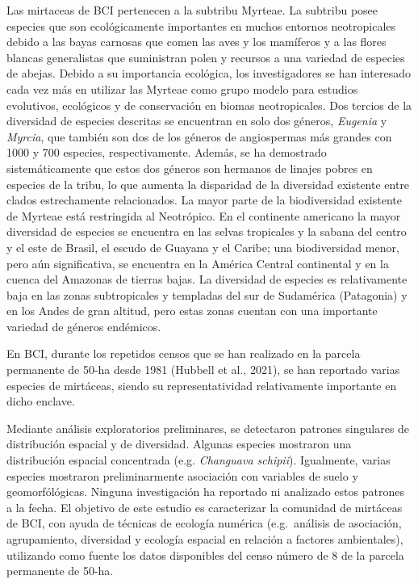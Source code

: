 \documentclass[11pt,]{article}
\begin{document}
Las mirtaceas de BCI pertenecen a la subtribu Myrteae. La subtribu posee
especies que son ecológicamente importantes en muchos entornos
neotropicales debido a las bayas carnosas que comen las aves y los
mamíferos y a las flores blancas generalistas que suministran polen y
recursos a una variedad de especies de abejas. Debido a su importancia
ecológica, los investigadores se han interesado cada vez más en utilizar
las Myrteae como grupo modelo para estudios evolutivos, ecológicos y de
conservación en biomas neotropicales. Dos tercios de la diversidad de
especies descritas se encuentran en solo dos géneros, \emph{Eugenia} y
\emph{Myrcia}, que también son dos de los géneros de angiospermas más
grandes con 1000 y 700 especies, respectivamente. Además, se ha
demostrado sistemáticamente que estos dos géneros son hermanos de
linajes pobres en especies de la tribu, lo que aumenta la disparidad de
la diversidad existente entre clados estrechamente relacionados. La
mayor parte de la biodiversidad existente de Myrteae está restringida al
Neotrópico. En el continente americano la mayor diversidad de especies
se encuentra en las selvas tropicales y la sabana del centro y el este
de Brasil, el escudo de Guayana y el Caribe; una biodiversidad menor,
pero aún significativa, se encuentra en la América Central continental y
en la cuenca del Amazonas de tierras bajas. La diversidad de especies es
relativamente baja en las zonas subtropicales y templadas del sur de
Sudamérica (Patagonia) y en los Andes de gran altitud, pero estas zonas
cuentan con una importante variedad de géneros endémicos.

En BCI, durante los repetidos censos que se han realizado en la parcela
permanente de 50-ha desde 1981 (Hubbell et al., 2021), se han reportado
varias especies de mirtáceas, siendo su representatividad relativamente
importante en dicho enclave.

Mediante análisis exploratorios preliminares, se detectaron patrones
singulares de distribución espacial y de diversidad. Algunas especies
mostraron una distribución espacial concentrada (e.g. \emph{Changuava
schipii}). Igualmente, varias especies mostraron preliminarmente
asociación con variables de suelo y geomorfólógicas. Ninguna
investigación ha reportado ni analizado estos patrones a la fecha. El
objetivo de este estudio es caracterizar la comunidad de mirtáceas de
BCI, con ayuda de técnicas de ecología numérica (e.g.~análisis de
asociación, agrupamiento, diversidad y ecología espacial en relación a
factores ambientales), utilizando como fuente los datos disponibles del
censo número de 8 de la parcela permanente de 50-ha.
\end{document}
